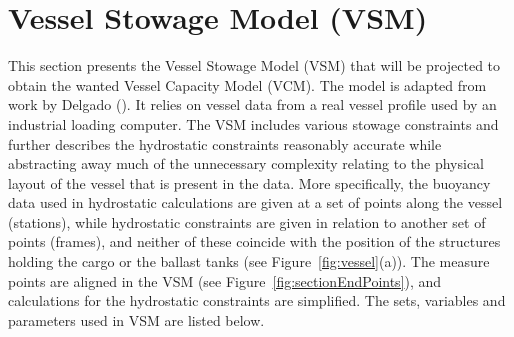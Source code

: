 \section{Vessel Stowage Model (VSM)} \label{sec:stowmodel}
This section presents the Vessel Stowage Model (VSM) that will be projected to obtain the wanted Vessel Capacity Model (VCM). The model is adapted from work by Delgado (\cite{AlbertosThesis}). It relies on vessel data from a real vessel profile used by an industrial loading computer. The VSM includes various stowage constraints and further describes the hydrostatic constraints reasonably accurate while abstracting away much of the unnecessary complexity relating to the physical layout of the vessel that is present in the data. More specifically, the buoyancy data used in hydrostatic calculations are given at a set of points along the vessel (stations), while hydrostatic constraints are given in relation to another set of points (frames), and neither of these coincide with the position of the structures holding the cargo or the ballast tanks (see Figure~\ref{fig:vessel}(a)). The measure points are aligned in the VSM (see Figure~\ref{fig:sectionEndPoints}), and calculations for the hydrostatic constraints are simplified. The sets, variables and parameters used in VSM are listed below.

